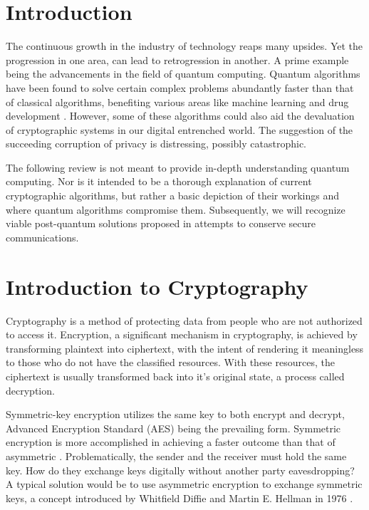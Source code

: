 \section{Introduction}
The continuous growth in the industry of technology reaps many upsides. 
Yet the progression in one area, can lead to retrogression in another.
A prime example being the advancements in the field of quantum computing.
Quantum algorithms have been found to solve certain complex problems abundantly faster than that of classical algorithms, benefiting various areas like machine learning and drug development \cite{Q_Comp_Real}. 
However, some of these algorithms could also aid the devaluation of cryptographic systems in our digital entrenched world. The suggestion of the succeeding corruption of privacy is distressing, possibly catastrophic. 



The following review is not meant to provide in-depth understanding quantum computing. Nor is it intended to be a thorough explanation of current cryptographic algorithms, but rather a basic depiction of their workings and where quantum algorithms compromise them.
Subsequently, we will recognize viable post-quantum solutions proposed in attempts to conserve secure communications.

\section{Introduction to Cryptography}
Cryptography is a method of protecting data from people who are not authorized to access it. Encryption, a significant mechanism in cryptography, is achieved by transforming plaintext into ciphertext, with the intent of rendering it meaningless to those who do not have the classified resources. With these resources, the ciphertext is usually transformed back into it's original state, a process called decryption.

Symmetric-key encryption utilizes the same key to both encrypt and decrypt, Advanced Encryption Standard (AES) being the prevailing form. Symmetric encryption is more accomplished in achieving a faster outcome than that of asymmetric \cite{Understanding_Cryptog}. Problematically, the sender and the receiver must hold the same key. How do they exchange keys digitally without another party eavesdropping? A typical solution would be to use asymmetric encryption to exchange symmetric keys, a concept introduced by Whitfield Diffie and Martin E. Hellman in 1976 \cite{PKC}.

